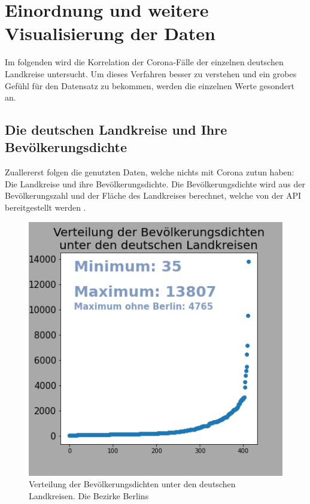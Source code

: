 \section{Einordnung und weitere Visualisierung der Daten}
Im folgenden wird die Korrelation der Corona-Fälle der einzelnen deutschen Landkreise untersucht. Um dieses Verfahren besser zu verstehen und ein grobes Gefühl für den Datensatz zu bekommen, werden die einzelnen Werte gesondert an.

\subsection{Die deutschen Landkreise und Ihre Bevölkerungsdichte}
Zuallererst folgen die genutzten Daten, welche nichts mit Corona zutun haben: Die Landkreise und ihre Bevölkerungsdichte. Die Bevölkerungsdichte wird aus der Bevölkerungszahl und der Fläche des Landkreises berechnet, welche von der API bereitgestellt werden .\\
\begin{figure}
    \centering
    \includegraphics[width=0.\textwidth]{figures/Vorgehensweise/population_density_counties_distribution.png}
    \caption{Verteilung der Bevölkerungsdichten unter den deutschen Landkreisen. Die Bezirke Berlins}
    \label{fig:distribution_pop_density_counties}
\end{figure}

